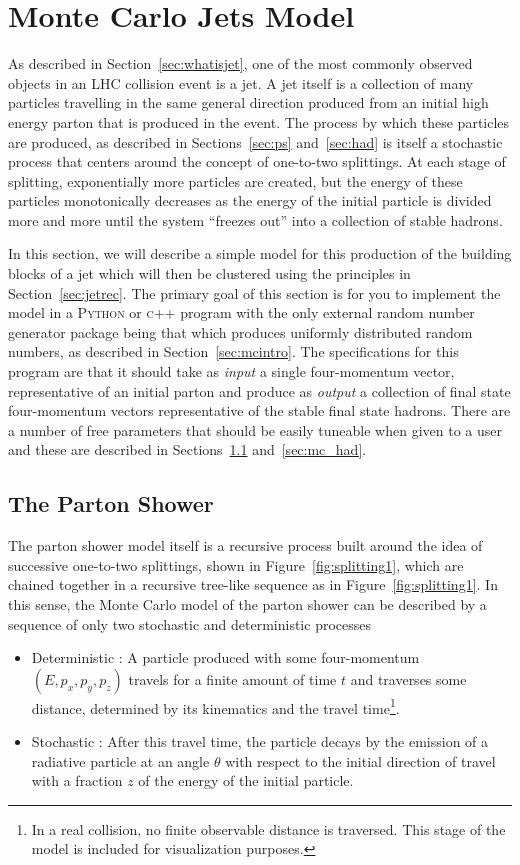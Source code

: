 \documentclass[UKenglish,texlive=2016]{\ATLASLATEXPATH atlasdoc}
\begin{document}
\section{Monte Carlo Jets Model}
\label{sec:mcmodel}
As described in Section~\ref{sec:whatisjet}, one of the most commonly observed objects in an LHC collision event is a jet.  A jet itself is a collection of many particles travelling in the same general direction produced from an initial high energy parton that is produced in the event.  The process by which these particles are produced, as described in Sections~\ref{sec:ps} and~\ref{sec:had} is itself a stochastic process that centers around the concept of one-to-two splittings.  At each stage of splitting, exponentially more particles are created, but the energy of these particles monotonically decreases as the energy of the initial particle is divided more and more until the system ``freezes out'' into a collection of stable hadrons.  

In this section, we will describe a simple model for this production of the building blocks of a jet which will then be clustered using the principles in Section~\ref{sec:jetrec}.  The primary goal of this section is for you to implement the model in a \textsc{Python} or \textsc{c++} program with the only external random number generator package being that which produces uniformly distributed random numbers, as described in Section~\ref{sec:mcintro}.  The specifications for this program are that it should take as \textit{input} a single four-momentum vector, representative of an initial parton and produce as \textit{output} a collection of final state four-momentum vectors representative of the stable final state hadrons.  There are a number of free parameters that should be easily tuneable when given to a user and these are described in Sections~\ref{sec:mc_ps} and~\ref{sec:mc_had}.

\subsection{The Parton Shower}
\label{sec:mc_ps}
The parton shower model itself is a recursive process built around the idea of successive one-to-two splittings, shown in Figure~\ref{fig:splitting1}, which are chained together in a recursive tree-like sequence as in Figure~\ref{fig:splitting1}.  In this sense, the Monte Carlo model of the parton shower can be described by a sequence of only two stochastic and deterministic processes

\begin{itemize}
\item Deterministic : A particle produced with some four-momentum $(E,p_x,p_y,p_z)$ travels for a finite amount of time $t$ and traverses some distance, determined by its kinematics and the travel time\footnote{In a real collision, no finite observable distance is traversed.  This stage of the model is included for visualization purposes.}.
\item Stochastic : After this travel time, the particle decays by the emission of a radiative particle at an angle $\theta$ with respect to the initial direction of travel with a fraction $z$ of the energy of the initial particle.  
\end{itemize}
\end{document}
